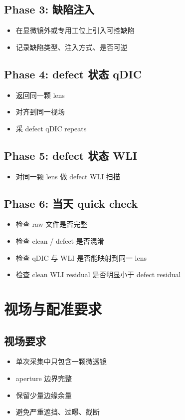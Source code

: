 \documentclass[UTF8,a4paper,11pt]{ctexart}
\begin{document}
\subsection{Phase 3: 缺陷注入}
\begin{itemize}
  \item 在显微镜外或专用工位上引入可控缺陷
  \item 记录缺陷类型、注入方式、是否可逆
\end{itemize}

\subsection{Phase 4: defect 状态 qDIC}
\begin{itemize}
  \item 返回同一颗 lens
  \item 对齐到同一视场
  \item 采 defect qDIC repeats
\end{itemize}

\subsection{Phase 5: defect 状态 WLI}
\begin{itemize}
  \item 对同一颗 lens 做 defect WLI 扫描
\end{itemize}

\subsection{Phase 6: 当天 quick check}
\begin{itemize}
  \item 检查 raw 文件是否完整
  \item 检查 clean / defect 是否混淆
  \item 检查 qDIC 与 WLI 是否能映射到同一 lens
  \item 检查 clean WLI residual 是否明显小于 defect residual
\end{itemize}

\section{视场与配准要求}

\subsection{视场要求}
\begin{itemize}
  \item 单次采集中只包含一颗微透镜
  \item aperture 边界完整
  \item 保留少量边缘余量
  \item 避免严重遮挡、过曝、截断
\end{itemize}
\end{document}
